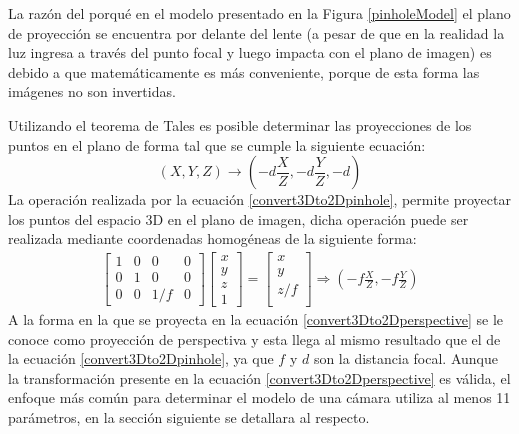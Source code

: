 La razón del porqué en el modelo presentado en la Figura \ref{pinholeModel} el plano de proyección se encuentra por delante del lente (a pesar de que en la realidad la luz ingresa a través del punto focal y luego impacta con el plano de imagen) es debido a que matemáticamente es más conveniente, porque de esta forma las imágenes no son invertidas.

Utilizando el teorema de Tales es posible determinar las proyecciones de los puntos en el plano de forma tal que se cumple la siguiente ecuación:
\begin{equation}
    (X, Y, Z) \longrightarrow (-d\frac{X}{Z}, -d\frac{Y}{Z}, -d)  \label{convert3Dto2Dpinhole}
\end{equation}
La operación realizada por la ecuación \ref{convert3Dto2Dpinhole}, permite proyectar los puntos del espacio 3D en el plano de imagen, dicha operación puede ser realizada mediante coordenadas homogéneas de la siguiente forma:
\begin{align}
            \begin{bmatrix}
            1 & 0 & 0 & 0\\
            0 & 1 & 0 & 0\\
            0 & 0 & 1/f & 0
            \end{bmatrix}
            \begin{bmatrix}
            x\\
            y\\
            z\\
            1
            \end{bmatrix}
            =
            \begin{bmatrix}
            x\\
            y\\
            z/f\\
            \end{bmatrix} \Rightarrow \left(-f\frac{X}{Z}, -f\frac{Y}{Z}\right)\label{convert3Dto2Dperspective}
\end{align}
A la forma en la que se proyecta en la ecuación \ref{convert3Dto2Dperspective} se le conoce como proyección de perspectiva y esta llega al mismo resultado que el de la ecuación \ref{convert3Dto2Dpinhole}, ya que $f$ y $d$ son la distancia focal. Aunque la transformación presente en la ecuación \ref{convert3Dto2Dperspective} es válida, el enfoque más común para determinar el modelo de una cámara utiliza al menos 11 parámetros, en la sección siguiente se detallara al respecto.
